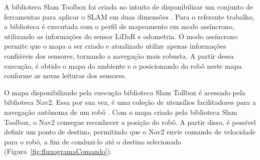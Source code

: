 A biblioteca Slam Toolbox foi criada no intuito de disponibilizar um conjunto de ferramentas para aplicar o SLAM em duas dimensões \cite{slamtoolbox}. Para o referente trabalho, a biblioteca é executada com o perfil de mapeamento em modo assíncrono, utilizando as informações do sensor LiDaR e odometria.  O modo assíncrono permite que o mapa a ser criado e atualizado utilize apenas informações confiáveis dos sensores, tornando a navegação mais robusta. A partir dessa execução, é obtido o mapa do ambiente e o posicionando do robô neste mapa conforme as novas leituras dos sensores.

O mapa disponibilizado pela execução biblioteca Slam Tollbox é acessado pela biblioteca Nav2. Essa por sua vez, é uma coleção de utensílios facilitadores para a navegação autônoma de um robô \cite{nav2}. Com o mapa criado pela biblioteca Slam Toolbox, o Nav2 consegue reconhecer a posição do robô. A partir disso, é possível definir um ponto de destino, permitindo que o Nav2  envie comando de velocidade  para o robô, a fim de conduzi-lo até o destino selecionado (Figura~\ref{fig:fluxogramaComando}).

